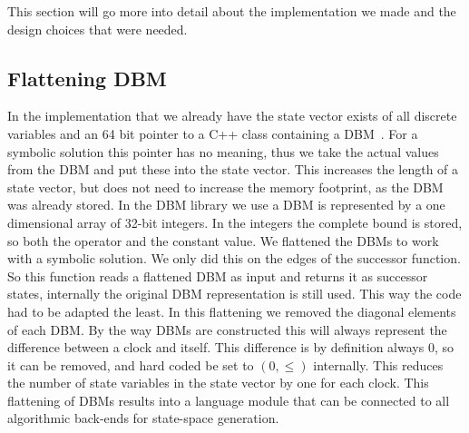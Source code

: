 This section will go more into detail about the implementation we made and the design choices that were needed. 

\subsection{Flattening DBM}
In the \ltsmin{} implementation that we already have the state vector exists of all discrete variables and an 64 bit pointer to a C++ class containing a DBM~\cite{eemcs21972}. For a symbolic solution this pointer has no meaning, thus we take the actual values from the DBM and put these into the state vector. This increases the length of a state vector, but does not need to increase the memory footprint, as the DBM was already stored. 
In the DBM library we use a DBM is represented by a one dimensional array of 32-bit integers. In the integers the complete bound is stored, so both the operator and the constant value. We flattened the DBMs to work with a symbolic solution. We only did this on the edges of the successor function. So this function reads a flattened DBM as input and returns it as successor states, internally the original DBM representation is still used. This way the code had to be adapted the least. In this flattening we removed the diagonal elements of each DBM. By the way DBMs are constructed this will always represent the difference between a clock and itself. This difference is by definition always 0, so it can be removed, and hard coded be set to $(0,\leq)$ internally. This reduces the number of state variables in the state vector by one for each clock. This flattening of DBMs results into a language module that can be connected to all \ltsmin{} algorithmic back-ends for state-space generation. 

